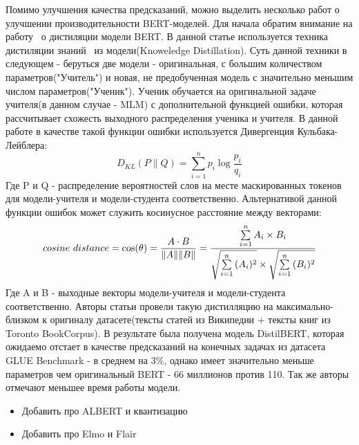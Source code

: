 \par Помимо улучшения качества предсказаний, можно выделить несколько работ о улучшении производительности BERT-моделей. Для начала обратим внимание на работу~\cite{distilbert} о дистиляции модели BERT. В данной статье используется техника дистиляции знаний~\cite{know-dist} из модели(Knoweledge Distillation). Суть данной техники в следующем - беруться две модели - оригинальная, с большим количеством параметров("Учитель") и новая, не предобученная модель с значительно меньшим числом параметров("Ученик"). Ученик обучается на оригинальной задаче учителя(в данном случае - MLM) с дополнительной функцией ошибки, которая рассчитывает схожесть выходного распределения ученика и учителя. В данной работе в качестве такой функции ошибки используется Дивергенция Кульбака-Лейблера: $$D_{KL}(P\parallel Q)=\sum \limits _{i=1}^{n}p_{i}\log {\frac {p_{i}}{q_{i}}}$$ Где P и Q - распределение вероятностей слов на месте маскированных токенов для модели-учителя и модели-студента соответственно.
Альтернативой данной функции ошибок может служить косинусное расстояние между векторами: $$cosine~distance=\cos(\theta )={A\cdot B \over \|A\|\|B\|}={\frac  {\sum \limits _{{i=1}}^{{n}}{A_{i}\times B_{i}}}{{\sqrt  {\sum \limits _{{i=1}}^{{n}}{(A_{i})^{2}}}}\times {\sqrt  {\sum \limits _{{i=1}}^{{n}}{(B_{i})^{2}}}}}}$$ Где A и B - выходные векторы модели-учителя и модели-студента соответственно.
Авторы статьи провели такую дистилляцию на максимально-близком к оригиналу датасете(тексты статей из Википедии + тексты книг из Toronto BookCorpus). В результате была получена модель DistilBERT, которая ожидаемо отстает в качестве предсказаний на конечных задачах из датасета GLUE Benchmark - в среднем на 3\%, однако имеет значительно меньше параметров чем оригинальный BERT - 66 миллионов против 110. Так же авторы отмечают меньшее время работы модели.

\begin{itemize}
    \item Добавить про ALBERT и квантизацию
    \item Добавить про Elmo и Flair
\end{itemize}


\clearpage
